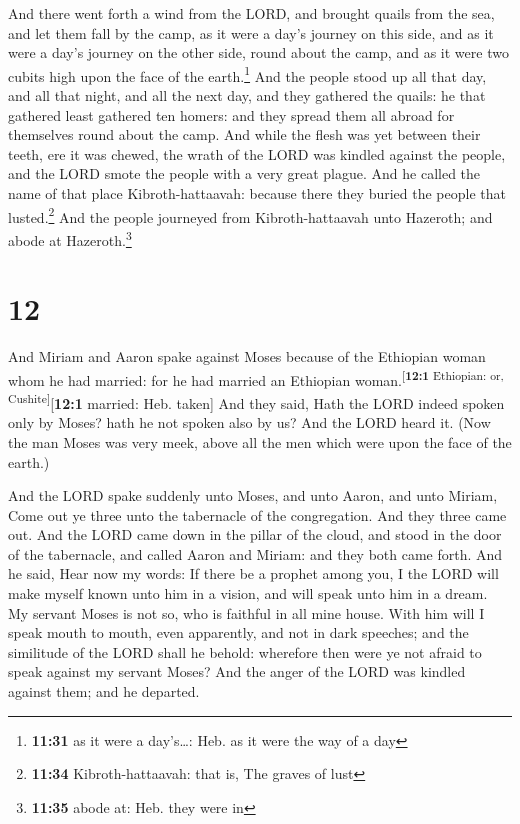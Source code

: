  And there went forth a wind from the LORD, and brought
quails from the sea, and let them fall by the camp, as it were a day's
journey on this side, and as it were a day's journey on the other side,
round about the camp, and as it were two cubits high upon the face of
the earth.\footnote{\textbf{11:31} as it were a day's\ldots: Heb. as it
  were the way of a day}  And the people stood up all
that day, and all that night, and all the next day, and they gathered
the quails: he that gathered least gathered ten homers: and they spread
them all abroad for themselves round about the camp.  And
while the flesh was yet between their teeth, ere it was chewed, the
wrath of the LORD was kindled against the people, and the LORD smote the
people with a very great plague.  And he called the name
of that place Kibroth-hattaavah: because there they buried the people
that lusted.\footnote{\textbf{11:34} Kibroth-hattaavah: that is, The
  graves of lust}  And the people journeyed from
Kibroth-hattaavah unto Hazeroth; and abode at Hazeroth.\footnote{\textbf{11:35}
  abode at: Heb. they were in}

\hypertarget{section-11}{%
\section{12}\label{section-11}}

 And Miriam and Aaron spake against Moses because of the
Ethiopian woman whom he had married: for he had married an Ethiopian
woman.\textsuperscript{{[}\textbf{12:1} Ethiopian: or,
Cushite{]}}{[}\textbf{12:1} married: Heb. taken{]}  And
they said, Hath the LORD indeed spoken only by Moses? hath he not spoken
also by us? And the LORD heard it.  (Now the man Moses was
very meek, above all the men which were upon the face of the earth.)

 And the LORD spake suddenly unto Moses, and unto Aaron,
and unto Miriam, Come out ye three unto the tabernacle of the
congregation. And they three came out.  And the LORD came
down in the pillar of the cloud, and stood in the door of the
tabernacle, and called Aaron and Miriam: and they both came forth.
 And he said, Hear now my words: If there be a prophet
among you, I the LORD will make myself known unto him in a vision, and
will speak unto him in a dream.  My servant Moses is not
so, who is faithful in all mine house.  With him will I
speak mouth to mouth, even apparently, and not in dark speeches; and the
similitude of the LORD shall he behold: wherefore then were ye not
afraid to speak against my servant Moses?  And the anger
of the LORD was kindled against them; and he departed.

